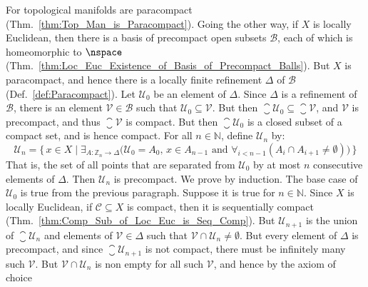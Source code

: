         \begin{solution}
            For topological manifolds are paracompact
            (Thm.~\ref{thm:Top_Man_is_Paracompact}). Going the other way, if $X$
            is locally Euclidean, then there is a basis of precompact open
            subsets $\mathcal{B}$, each of which is homeomorphic to $\nspace$
            (Thm.~\ref{thm:Loc_Euc_Existence_of_Basis_of_Precompact_Balls}). But
            $X$ is paracompact, and hence there is a locally finite refinement
            $\Delta$ of $\mathcal{B}$ (Def.~\ref{def:Paracompact}). Let
            $\mathcal{U}_{0}$ be an element of $\Delta$. Since $\Delta$ is a
            refinement of $\mathcal{B}$, there is an element
            $\mathcal{V}\in\mathcal{B}$ such that
            $\mathcal{U}_{0}\subseteq\mathcal{V}$. But then
            $\closure{\mathcal{U}_{0}}\subseteq\closure{\mathcal{V}}$, and
            $\mathcal{V}$ is precompact, and thus $\closure{\mathcal{V}}$
            is compact. But then $\closure{\mathcal{U}_{0}}$ is a closed subset
            of a compact set, and is hence compact. For all $n\in\mathbb{N}$,
            define $\mathcal{U}_{n}$ by:
            \begin{equation}
                \mathcal{U}_{n}=\Big\{\,x\in{X}\;|\;
                    \exists_{A:\mathbb{Z}_{n}\rightarrow\Delta}\big(
                        \mathcal{U}_{0}=A_{0},\,x\in{A}_{n-1}\textrm{ and }
                        \forall_{i<n-1}(A_{i}\cap{A}_{i+1}\ne\emptyset)
                    \big)\,\Big\}
            \end{equation}
            That is, the set of all points that are separated from
            $\mathcal{U}_{0}$ by at most $n$ consecutive elements of $\Delta$.
            Then $\mathcal{U}_{n}$ is precompact. We prove by induction. The
            base case of $\mathcal{U}_{0}$ is true from the previous paragraph.
            Suppose it is true for $n\in\mathbb{N}$. Since $X$ is locally
            Euclidean, if $\mathcal{C}\subseteq{X}$ is compact, then it is
            sequentially compact
            (Thm.~\ref{thm:Comp_Sub_of_Loc_Euc_is_Seq_Comp}). But
            $\mathcal{U}_{n+1}$ is the union of $\closure{\mathcal{U}_{n}}$
            and elements of $\mathcal{V}\in\Delta$ such that
            $\mathcal{V}\cap\mathcal{U}_{n}\ne\emptyset$. But every element of
            $\Delta$ is precompact, and since $\closure{\mathcal{U}_{n+1}}$ is
            not compact, there must be infinitely many such $\mathcal{V}$. But
            $\mathcal{V}\cap\mathcal{U}_{n}$ is non
            empty for all such $\mathcal{V}$, and hence by the axiom of choice

\end{solution}
